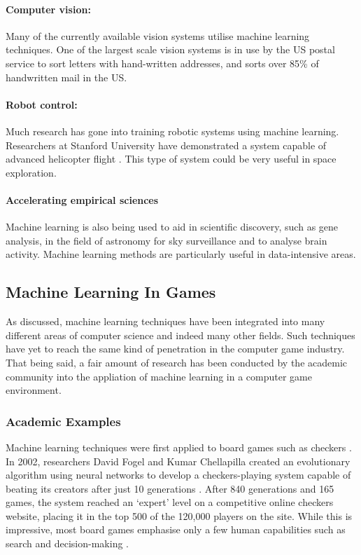 \documentclass[a4paper,oneside]{report}
\begin{document}
\paragraph{Computer vision:} Many of the currently available vision systems utilise machine learning techniques. One of the largest scale vision systems is in use by the US postal service to sort letters with hand-written addresses, and sorts over 85\% of handwritten mail in the US.

\paragraph{Robot control:} Much research has gone into training robotic systems using machine learning. Researchers at Stanford University have demonstrated a system capable of advanced helicopter flight \cite{Ng:2004dz, Abbeel07anapplication, Abbeel:fu}. This type of system could be very useful in space exploration.

\paragraph{Accelerating empirical sciences} Machine learning is also being used to aid in scientific discovery, such as gene analysis, in the field of astronomy for sky surveillance and to analyse brain activity. Machine learning methods are particularly useful in data-intensive areas.

\subsection{Machine Learning In Games}

As discussed, machine learning techniques have been integrated into many different areas of computer science and indeed many other fields. Such techniques have yet to reach the same kind of penetration in the computer game industry. That being said, a fair amount of research has been conducted by the academic community into the appliation of machine learning in a computer game environment. 

\subsubsection{Academic Examples}

Machine learning techniques were first applied to board games such as checkers \cite{Samuel:1959qo, Samuel:1967ye}. In 2002, researchers David Fogel and Kumar Chellapilla created an evolutionary algorithm using neural networks to develop a checkers-playing system capable of beating its creators after just 10 generations \cite{Fogel:2003fk}. After 840 generations and 165 games, the system reached an `expert' level on a competitive online checkers website, placing it in the top 500 of the 120,000 players on the site. While this is impressive, most board games emphasise only a few human capabilities such as search and decision-making \cite{Laird:2001tw}. 
\end{document}
